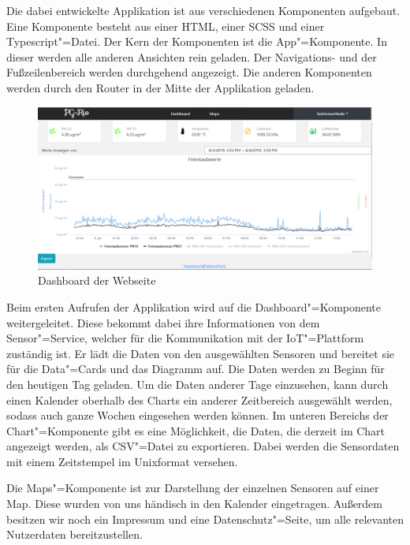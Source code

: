Die dabei entwickelte Applikation ist aus verschiedenen Komponenten aufgebaut.
Eine Komponente besteht aus einer HTML, einer SCSS und einer Typescript"=Datei.
Der Kern der Komponenten ist die App"=Komponente.
In dieser werden alle anderen Ansichten rein geladen.
Der Navigations- und der Fußzeilenbereich werden durchgehend angezeigt.
Die anderen Komponenten werden durch den Router in der Mitte der Applikation geladen. 

\begin{figure}[h]
	\centering
	\includegraphics[width=\textwidth]{./ressourcen/schit-dashboard-frontend.png}
	\caption{Dashboard der Webseite}
\end{figure}

Beim ersten Aufrufen der Applikation wird auf die Dashboard"=Komponente weitergeleitet.
Diese bekommt dabei ihre Informationen von dem Sensor"=Service, welcher für die Kommunikation mit der IoT"=Plattform zuständig ist.
Er lädt die Daten von den ausgewählten Sensoren und bereitet sie für die Data"=Cards und das Diagramm auf.
Die Daten werden zu Beginn für den heutigen Tag geladen.
Um die Daten anderer Tage einzusehen, kann durch einen Kalender oberhalb des Charts ein anderer Zeitbereich ausgewählt werden, sodass auch ganze Wochen eingesehen werden können.
Im unteren Bereichs der Chart"=Komponente gibt es eine Möglichkeit, die Daten, die derzeit im Chart angezeigt werden, als CSV"=Datei zu exportieren.
Dabei werden die Sensordaten mit einem Zeitstempel im Unixformat versehen. 

Die Maps"=Komponente ist zur Darstellung der einzelnen Sensoren auf einer Map.
Diese wurden von uns händisch in den Kalender eingetragen.
Außerdem besitzen wir noch ein Impressum und eine Datenschutz"=Seite, um alle relevanten Nutzerdaten bereitzustellen. 


